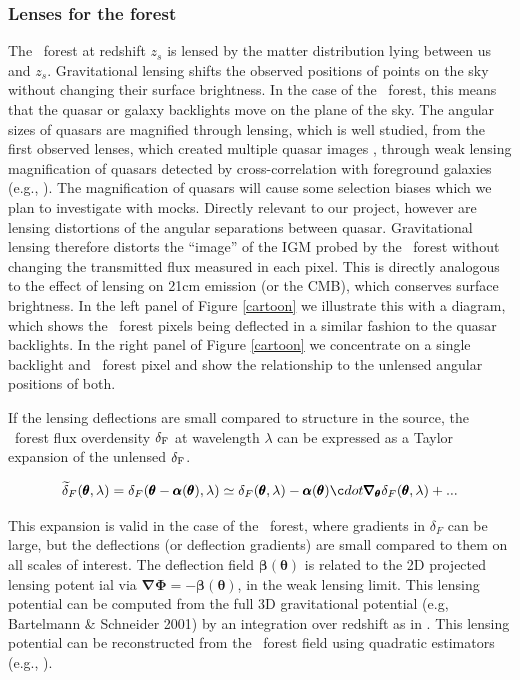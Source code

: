 \subsubsection{Lenses for the forest}

The \lya\ forest at redshift $z_{s}$ is lensed by the matter
distribution lying between us and $z_{s}$. Gravitational lensing
shifts the observed positions of points on the sky without changing
their surface brightness.  In the case of the \lya\ forest, this means
that the quasar or galaxy backlights move on the plane of the sky.
The angular sizes of quasars are magnified through lensing, which is
well studied, from the first observed lenses, which created multiple
quasar images \citep{walsh1979}, through weak lensing
magnification of quasars detected by cross-correlation with foreground
galaxies (e.g., \citealt{scranton2005}).  The magnification of
quasars will cause some selection biases which we plan to investigate
with mocks. Directly relevant to our project, however
are lensing distortions of the angular separations between quasar. 
  Gravitational lensing therefore distorts the ``image'' of the 
IGM probed by the \lya\ forest without
changing the transmitted flux measured in each pixel. This is directly
analogous to the effect of lensing on 21cm emission (or the CMB),
which conserves surface brightness.  In
the left panel of Figure \ref{cartoon} we
illustrate this with a diagram, which shows the \lya\ forest pixels
being deflected in a similar fashion to the quasar backlights. In
the right panel of 
Figure \ref{cartoon} we concentrate on a single backlight and \lya\
forest pixel and show the relationship to the unlensed angular
positions of both.


If the lensing deflections are small
compared to structure in the source, the \lya\ forest 
flux overdensity $\delta_{\rm F}$  at wavelength $\lambda$ can
be expressed as a Taylor expansion of the unlensed $\delta_{\rm F}$.

\begin{equation}
\widetilde{\delta}_{F}({ \pmb {\theta}},\lambda)=
{\delta_{F}}({ \pmb {\theta}} - {\pmb { \alpha}}({\pmb {\theta}}) ,\lambda)
\simeq {\delta_{F}} ({\pmb{\theta}},\lambda) - {\pmb {\alpha}}({\pmb{\theta}})\c
dot
{\pmb{\nabla_{\theta}}} \delta_{F} ({\pmb{\theta}},\lambda) + ...
\label{taylor}
\end{equation}

 This expansion is  valid in the case of the \lya\ forest, where gradients
in $\delta_{F}$ can be large, but the deflections (or deflection gradients) 
are small compared to them on all scales of interest. The deflection field
${\pmb {\beta}}( {\pmb {\theta}})$ is related to the 2D projected lensing potent
ial via
${\pmb {\nabla \Phi}} =- {\pmb {\beta}}({\pmb {\theta}} )$,
in the weak lensing limit. This lensing potential can be
computed from the full 3D gravitational
potential (e.g, Bartelmann \& Schneider 2001) by an integration
over redshift as in .
This lensing potential
can  be reconstructed from the \lya\ forest field using 
quadratic estimators (e.g., \citealt{okamoto}).

